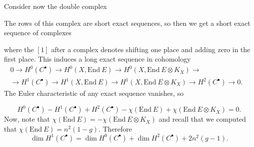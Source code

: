 \documentclass[12pt,a4paper]{book}
\theoremstyle{definition} \newtheorem{defn}[thm]{Definition}
\theoremstyle{definition} \newtheorem{ejemplo}[thm]{Example}
\theoremstyle{remark} \newtheorem{rem}[thm]{Remark}
\def\pr{\mathrm{pr}}
\def\End{\mathrm{End}}
\def\delbar{\bar{\partial}}
\newcommand{\ve}[1]{\mathbf{#1}}
\begin{document}
	      Consider now the double complex
	      \begin{center}
	      \end{center}
	      The rows of this complex are short exact sequences, so then we get a short exact sequence of complexes
	      \begin{center}
	      \end{center}
	      where the $[1]$ after a complex denotes shifting one place and adding zero in the first place. This induces a long exact sequence in cohomology
	      \begin{align*}
		  0 \rightarrow  H^0(C^\bullet) \rightarrow  H^0(X,\End\ E) \rightarrow H^0(X,\End\ E \otimes K_X) \rightarrow &		  \\ 
		  \rightarrow H^1(C^\bullet) \rightarrow H^1(X, \End\ E) \rightarrow H^1(X, \End\ E \otimes K_X) \rightarrow H^2(C^\bullet) \rightarrow 0.
	      \end{align*}
	      The Euler characteristic of any exact sequence vanishes, so

	      \begin{equation*}
		H^0(C^\bullet) - H^1(C^\bullet) + H^2(C^\bullet) - \chi(\End\ E) + \chi(\End\ E \otimes K_X)=0.
	      \end{equation*}
	      Now, note that $\chi(\End\ E)= -\chi(\End\ E \otimes K_X)$ and recall that we computed that $\chi(\End\ E)= n^2(1-g)$. 
	      Therefore
	      \begin{equation*}
		\dim H^1(C^\bullet)= \dim H^0(C^\bullet) + \dim H^2(C^\bullet) + 2n^2(g-1).
	      \end{equation*}
\end{document}
